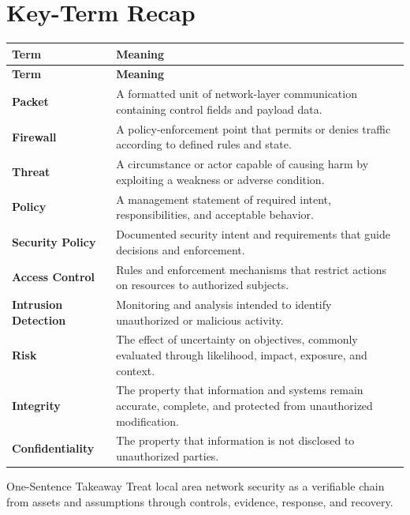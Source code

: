\documentclass[11pt,letterpaper]{article}
\begin{document}
\section*{Key-Term Recap}
\begin{longtable}{>{\raggedright\arraybackslash}p{}>{\raggedright\arraybackslash}p{}}
\toprule\rowcolor{Navy}\color{white}\textbf{Term} & \color{white}\textbf{Meaning}\\\midrule
\endfirsthead
\toprule\rowcolor{Navy}\color{white}\textbf{Term} & \color{white}\textbf{Meaning}\\\midrule
\endhead
\textbf{Packet} & A formatted unit of network-layer communication containing control fields and payload data. \\\midrule
\textbf{Firewall} & A policy-enforcement point that permits or denies traffic according to defined rules and state. \\\midrule
\textbf{Threat} & A circumstance or actor capable of causing harm by exploiting a weakness or adverse condition. \\\midrule
\textbf{Policy} & A management statement of required intent, responsibilities, and acceptable behavior. \\\midrule
\textbf{Security Policy} & Documented security intent and requirements that guide decisions and enforcement. \\\midrule
\textbf{Access Control} & Rules and enforcement mechanisms that restrict actions on resources to authorized subjects. \\\midrule
\textbf{Intrusion Detection} & Monitoring and analysis intended to identify unauthorized or malicious activity. \\\midrule
\textbf{Risk} & The effect of uncertainty on objectives, commonly evaluated through likelihood, impact, exposure, and context. \\\midrule
\textbf{Integrity} & The property that information and systems remain accurate, complete, and protected from unauthorized modification. \\\midrule
\textbf{Confidentiality} & The property that information is not disclosed to unauthorized parties. \\\midrule
\bottomrule
\end{longtable}
\begin{CornellExamBox}{One-Sentence Takeaway}
Treat local area network security as a verifiable chain from assets and assumptions through controls, evidence, response, and recovery.
\end{CornellExamBox}
\end{document}
